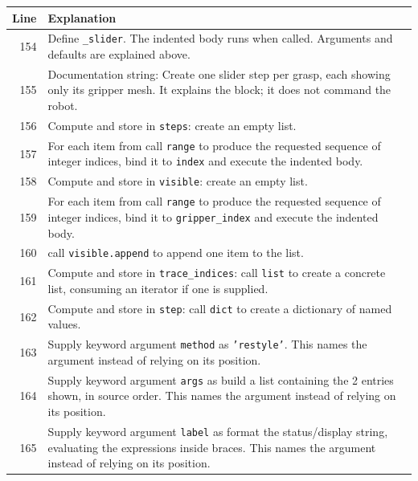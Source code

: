 \documentclass[11pt,a4paper]{book}
\begin{document}
\begin{longtable}{r p{}}

\textbf{Line} & \textbf{Explanation} \\ \hline \endhead

154 & Define \texttt{\_slider}. The indented body runs when called. Arguments and defaults are explained above. \\

155 & Documentation string: Create one slider step per grasp, each showing only its gripper mesh. It explains the block; it does not command the robot. \\

156 & Compute and store in \texttt{steps}: create an empty list.  \\

157 & For each item from call \texttt{range} to produce the requested sequence of integer indices, bind it to \texttt{index} and execute the indented body. \\

158 & Compute and store in \texttt{visible}: create an empty list.  \\

159 & For each item from call \texttt{range} to produce the requested sequence of integer indices, bind it to \texttt{gripper\_index} and execute the indented body. \\

160 & call \texttt{visible.append} to append one item to the list. \\

161 & Compute and store in \texttt{trace\_indices}: call \texttt{list} to create a concrete list, consuming an iterator if one is supplied.  \\

162 & Compute and store in \texttt{step}: call \texttt{dict} to create a dictionary of named values.  \\

163 & Supply keyword argument \texttt{method} as \texttt{'restyle'}. This names the argument instead of relying on its position. \\

164 & Supply keyword argument \texttt{args} as build a list containing the 2 entries shown, in source order. This names the argument instead of relying on its position. \\

165 & Supply keyword argument \texttt{label} as format the status/display string, evaluating the expressions inside braces. This names the argument instead of relying on its position. \\


\end{longtable}
\end{document}
